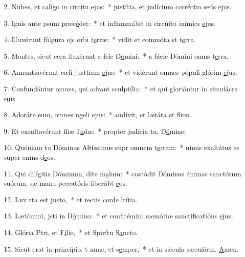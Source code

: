 2. Nubes, et calígo in circitu \uline{e}jus:~* justítia, et judícium corréctio seds \uline{e}jus.\par 
3. Ignis ante psum præc\uline{é}det:~* et inflammábit in circúitu inimícs \uline{e}jus.\par 
4. Illuxérunt fúlgura ejs orbi t\uline{e}rræ:~* vidit et commóta st t\uline{e}rra.\par 
5. Montes, sicut cera fluxérunt a fcie D\uline{ó}mini:~* a fácie Dómini omns t\uline{e}rra.\par 
6. Annuntiavérunt cæli justtiam \uline{e}jus:~* et vidérunt omnes pópuli glórim \uline{e}jus.\par 
7. Confundántur omnes, qui adrant sculpt\uline{í}lia:~* et qui gloriántur in simulácrs s\uline{u}is.\par 
8. Adoráte eum, omnes ngeli \uline{e}jus:~* audívit, et lætáta st S\uline{i}on.\par 
9. Et exsultavérunt fliæ J\uline{u}dæ:~* propter judícia tu, D\uline{ó}mine:\par 
10. Quóniam tu Dóminus Altíssimus supr omnem t\uline{e}rram:~* nimis exaltátus es super omns d\uline{e}os.\par 
11. Qui dilígitis Dóminum, díte m\uline{a}lum:~* custódit Dóminus ánimas sanctórum suórum, de manu peccatóris liberábt \uline{e}os.\par 
12. Lux rta est j\uline{u}sto,~* et rectis corde lt\uline{í}tia.\par 
13. Lætámini, jsti in D\uline{ó}mino:~* et confitémini memóriæ sanctificatións \uline{e}jus.\par 
14. Glória Ptri, et F\uline{í}lio,~* et Spirítu S\uline{a}ncto.\par 
15. Sicut erat in princípio, t nunc, et s\uline{e}mper,~* et in sǽcula sæculórm. \uline{A}men.\par 

